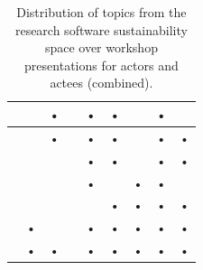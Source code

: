 \documentclass[11pt,letterpaper]{article}
\begin{document}
\begin{table}[h!]
\begin{tabular}{ccccccccc}
\hline
\cite{silva_track_2017} &                                 & •                                        &                                                    & •                                       & •                          &                                                     & •                            &                                                   \\ 
\hline
\cite{struck_track_2017} &                                 & •                                        &                                                    & •                                       & •                          &                                                     & •                            & •                                                 \\ 
\hline
\cite{washbrook_track_2017} &                                 &                                          &                                                    & •                                       & •                          &                                                     & •                            & •                                                 \\ 
\hline
\cite{dasler_track_2017} &                                 &                                          &                                                    & •                                       &                            & •                                                   & •                            &                                                   \\ 
\hline
\cite{alhozaimy_track_2017} &                                 &                                          &                                                    &                                         & •                          & •                                                   & •                            & •                                                 \\ 
\hline
\cite{maassen_track_2017} & •                               &                                          &                                                    & •                                       & •                          & •                                                   & •                            & •                                                 \\ 
\hline
\cite{druskat_track_2017} & •                               & •                                        &                                                    & •                                       & •                          & •                                                   & •                            & •                     \\
\hline
\end{tabular}
\caption{Distribution of topics from the research software sustainability
space over workshop presentations for actors and actees (combined).}
\label{tab:topics}
\end{table}
\end{document}
